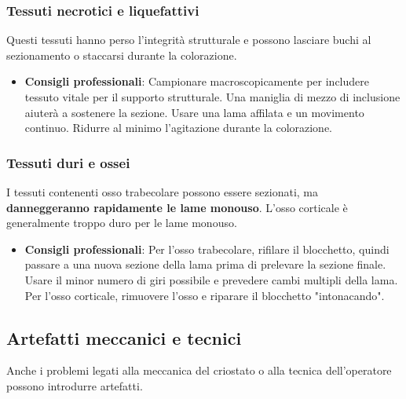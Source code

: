 \subsubsection{Tessuti necrotici e liquefattivi}
Questi tessuti hanno perso l'integrità strutturale e possono lasciare buchi al sezionamento o staccarsi durante la colorazione. 
\begin{itemize}
    \item   \textbf{Consigli professionali}: Campionare macroscopicamente per includere tessuto vitale per il supporto strutturale.  Una maniglia di mezzo di inclusione aiuterà a sostenere la sezione. Usare una lama affilata e un movimento continuo.  Ridurre al minimo l'agitazione durante la colorazione.
\end{itemize}

\subsubsection{Tessuti duri e ossei}
I tessuti contenenti osso trabecolare possono essere sezionati, ma \textbf{danneggeranno rapidamente le lame monouso}.  L'osso corticale è generalmente troppo duro per le lame monouso.
\begin{itemize}
    \item   \textbf{Consigli professionali}: Per l'osso trabecolare, rifilare il blocchetto, quindi passare a una nuova sezione della lama prima di prelevare la sezione finale.  Usare il minor numero di giri possibile e prevedere cambi multipli della lama.  Per l'osso corticale, rimuovere l'osso e riparare il blocchetto "intonacando". 
\end{itemize}

\subsection{Artefatti meccanici e tecnici}

Anche i problemi legati alla meccanica del criostato o alla tecnica dell'operatore possono introdurre artefatti. 

